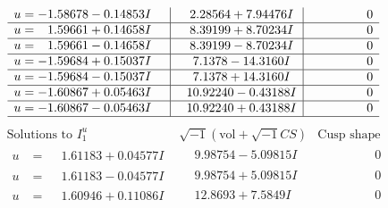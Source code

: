 \documentclass[1p]{elsarticle_modified}
\theoremstyle{definition}
\newcommand{\I}{\sqrt{-1}}
\begin{document}
$$\begin{array}{c|c|c}
\begin{aligned}
u &= -1.58678 - 0.14853 I\end{aligned}
 & \phantom{-}2.28564 + 7.94476 I & \phantom{-0.000000 } 0 \\ \hline\begin{aligned}
u &= \phantom{-}1.59661 + 0.14658 I\end{aligned}
 & \phantom{-}8.39199 + 8.70234 I & \phantom{-0.000000 } 0 \\ \hline\begin{aligned}
u &= \phantom{-}1.59661 - 0.14658 I\end{aligned}
 & \phantom{-}8.39199 - 8.70234 I & \phantom{-0.000000 } 0 \\ \hline\begin{aligned}
u &= -1.59684 + 0.15037 I\end{aligned}
 & \phantom{-}7.1378 - 14.3160 I & \phantom{-0.000000 } 0 \\ \hline\begin{aligned}
u &= -1.59684 - 0.15037 I\end{aligned}
 & \phantom{-}7.1378 + 14.3160 I & \phantom{-0.000000 } 0 \\ \hline\begin{aligned}
u &= -1.60867 + 0.05463 I\end{aligned}
 & \phantom{-}10.92240 - 0.43188 I & \phantom{-0.000000 } 0 \\ \hline\begin{aligned}
u &= -1.60867 - 0.05463 I\end{aligned}
 & \phantom{-}10.92240 + 0.43188 I & \phantom{-0.000000 } 0\\
 \hline 
 \end{array}$$\newpage$$\begin{array}{c|c|c}  
\text{Solutions to }I^u_{1}& \I (\text{vol} + \sqrt{-1}CS) & \text{Cusp shape}\\
 \hline 
\begin{aligned}
u &= \phantom{-}1.61183 + 0.04577 I\end{aligned}
 & \phantom{-}9.98754 - 5.09815 I & \phantom{-0.000000 } 0 \\ \hline\begin{aligned}
u &= \phantom{-}1.61183 - 0.04577 I\end{aligned}
 & \phantom{-}9.98754 + 5.09815 I & \phantom{-0.000000 } 0 \\ \hline\begin{aligned}
u &= \phantom{-}1.60946 + 0.11086 I\end{aligned}
 & \phantom{-}12.8693 + 7.5849 I & \phantom{-0.000000 } 0 \\ \hline\begin{aligned}

\end{aligned}
\end{array}$$
\end{document}
